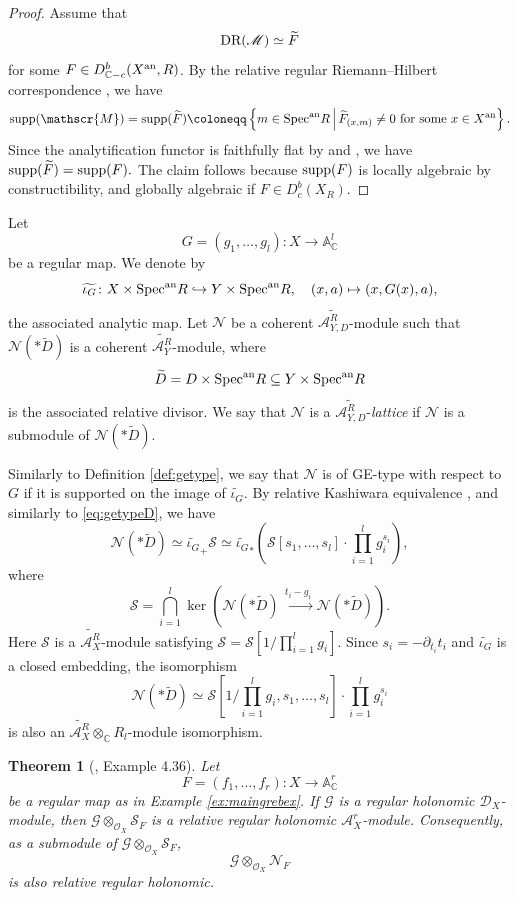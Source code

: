\documentclass{amsart}
\theoremstyle{plain}
\newtheorem{theorem}{Theorem}
\numberwithin{theorem}{section}
\theoremstyle{definition}
\theoremstyle{remark}
\theoremstyle{definition}
\newcommand{\wt}{\widetilde}
\newcommand{\A}{\mathbb{A}}
\newcommand{\C}{\mathbb{C}} %
\newcommand{\cG}{\mathcal{G}}
\newcommand{\cN}{\mathcal{N}}
\newcommand{\cO}{\mathscr{O}}
\newcommand{\cS}{\mathcal{S}}
\newcommand{\sM}{\mathscr{M}}
\newcommand{\sN}{\mathscr{N}}
\newcommand{\sA}{\mathscr{A}}
\newcommand{\sS}{\mathscr{S}}
\newcommand{\shD}{\mathscr{D}}
\newcommand{\Specan}{\textup{Spec}^{\textup{an}}}
\newcommand{\DR}{\textup{DR}}
\newcommand{\an}{\textup{an}}
\newcommand{\supp}{\textup{supp}}
\begin{document}
\begin{proof}
Assume that
\[
\DR(\sM)\simeq \wt F
\]
for some $F\in D^b_{\C-c}(X^\an,R)$. By the relative regular
Riemann--Hilbert correspondence \cite{FFS23}, we have
\[
\supp(\sM)
=
\supp(\wt F)
\coloneqq
\left\{
m\in \Specan R
\,\middle|\,
\wt F_{(x,m)}\neq 0
\text{ for some } x\in X^\an
\right\}.
\]
Since the analytification functor is faithfully flat by \cite[Cor.1]{Mai}
and \cite[Lem.5.6]{WuRHA}, we have
$\supp(\wt F)=\supp(F).$
The claim follows because $\supp(F)$ is locally algebraic by
constructibility, and globally algebraic if $F\in D^b_c(X_R)$.
\end{proof}

Let
\[
G=(g_1,\dots,g_l)\colon X\to \A_\C^l
\]
be a regular map. We denote by
\[
\wt{\iota_G}\colon
X\times \Specan R
\hookrightarrow
Y\times \Specan R,
\quad
(x,a)\mapsto (x,G(x),a),
\]
the associated analytic map. Let $\sN$ be a coherent
$\wt{\sA_{Y,D}^R}$-module such that $\sN(*\wt D)$ is a coherent
$\wt{\sA_Y^R}$-module, where
\[
\wt D=D\times \Specan R
\subseteq
Y\times \Specan R
\]
is the associated relative divisor. We say that $\sN$ is a
$\wt{\sA_{Y,D}^R}$-\emph{lattice} if $\sN$ is a submodule of
$\sN(*\wt D)$.

Similarly to Definition \ref{def:getype}, we say that $\sN$ is of GE-type
with respect to $G$ if it is supported on the image of $\wt{\iota_G}$. By
relative Kashiwara equivalence \cite[Thm.1.5]{FS17}, and similarly to
\eqref{eq:getypeD}, we have
\[
\sN(*\wt D)
\simeq
\wt{\iota_G}_+\sS
\simeq
\wt{\iota_G}_*
\left(
\sS[s_1,\dots,s_l]\cdot \prod_{i=1}^l g_i^{s_i}
\right),
\]
where
\[
\sS
=
\bigcap_{i=1}^l
\ker
\left(
\sN(*\wt D)
\xrightarrow{\,t_i-g_i\,}
\sN(*\wt D)
\right).
\]
Here $\sS$ is a $\wt{\sA_X^R}$-module satisfying
$\sS=\sS\left[1/\prod_{i=1}^l g_i\right].$
Since $s_i=-\partial_{t_i}t_i$ and $\wt{\iota_G}$ is a closed embedding, the
isomorphism
\begin{equation}\label{eq:relgetype}
\sN(*\wt D)
\simeq
\sS\left[
1/\prod_{i=1}^l g_i,
s_1,\dots,s_l
\right]\cdot
\prod_{i=1}^l g_i^{s_i}
\end{equation}
is also an $\wt{\sA_X^R}\otimes_\C R_l$-module isomorphism.

\begin{theorem}[\cite{FFS23}, Example 4.36]\label{thm:mainFFS}
Let
\[
F=(f_1,\dots,f_r)\colon X\to \A_\C^r
\]
be a regular map as in Example \ref{ex:maingrebex}. If $\cG$ is a regular
holonomic $\shD_X$-module, then
$\cG\otimes_{\cO_X}\cS_F$
is a relative regular holonomic $\sA_X^r$-module. Consequently, as a
submodule of $\cG\otimes_{\cO_X}\cS_F$,
\[
\cG\otimes_{\cO_X}\cN_F
\]
is also relative regular holonomic.
\end{theorem}
\end{document}
